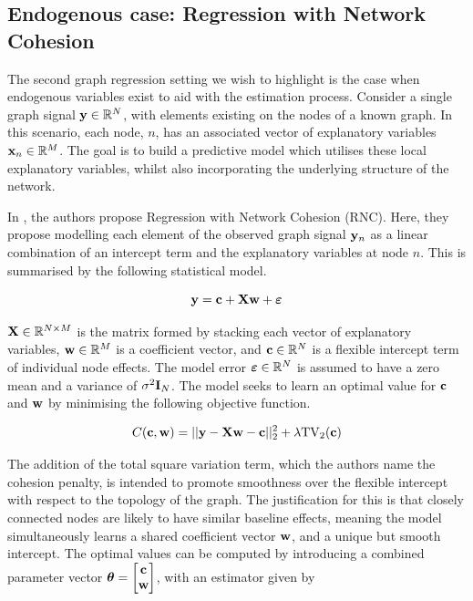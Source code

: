 \subsection{Endogenous case: Regression with Network Cohesion}

The second graph regression setting we wish to highlight is the case when endogenous variables exist to aid with the estimation process. Consider a single graph signal $\mathbf{y} \in \mathbb{R}^N$, with elements existing on the nodes of a known graph. In this scenario, each node, $n$, has an associated vector of explanatory variables $\mathbf{x}_n \in \mathbb{R}^M$. The goal is to build a predictive model which utilises these local explanatory variables, whilst also incorporating the underlying structure of the network. 

In \cite{Li2019}, the authors propose Regression with Network Cohesion (RNC). Here, they propose modelling each element of the observed graph signal $\mathbf{y}_n$ as a linear combination of an intercept term and the explanatory variables at node $n$. This is summarised by the following statistical model. 

\begin{equation}
    \mathbf{y} = \mathbf{c} + \mathbf{X} \mathbf{w} + \boldsymbol{\varepsilon}
\end{equation}

$\mathbf{X} \in \mathbb{R}^{N \times M}$ is the matrix formed by stacking each vector of explanatory variables, $\mathbf{w} \in \mathbb{R}^M$ is a coefficient vector, and $\mathbf{c} \in \mathbb{R}^N$ is a flexible intercept term of individual node effects. The model error $\boldsymbol{\varepsilon} \in \mathbb{R}^N$ is assumed to have a zero mean and a variance of $\sigma^2 \mathbf{I}_N$. The model seeks to learn an optimal value for $\mathbf{c}$ and $\mathbf{w}$ by minimising the following objective function. 

\begin{equation}
    \label{eq:RNC_objective}
    C(\mathbf{c}, \mathbf{w}) = ||\mathbf{y} - \mathbf{X} \mathbf{w} - \mathbf{c} ||^2_2 + \lambda \text{TV}_2(\mathbf{c})
\end{equation}

The addition of the total square variation term, which the authors name the cohesion penalty, is intended to promote smoothness over the flexible intercept with respect to the topology of the graph. The justification for this is that closely connected nodes are likely to have similar baseline effects, meaning the model simultaneously learns a shared coefficient vector $\mathbf{w}$, and a unique but smooth intercept. The optimal values can be computed by introducing a combined parameter vector $\boldsymbol{\theta} = \begin{bmatrix} \mathbf{c} \\ \mathbf{w}  \end{bmatrix}$, with an estimator given by 

